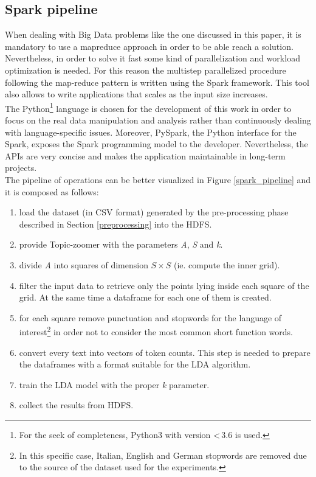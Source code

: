 \documentclass{sig-alternate-05-2015}
\begin{document}
\subsection{Spark pipeline}
When dealing with Big Data problems like the one discussed in this paper, it is mandatory to use a map\-reduce approach in order to be able reach a solution. Nevertheless, in order to solve it fast some kind of parallelization and workload optimization is needed. For this reason the multi\-step parallelized procedure following the map-reduce pattern is written using the Spark framework. This tool also allows to write applications that scales as the input size increases.\\
The Python\footnote{For the seek of completeness, Python3 with version \textless\,3.6 is used.} language is chosen for the development of this work in order to focus on the real data manipulation and analysis rather than continuously dealing with language-specific issues. Moreover, PySpark, the Python interface for the Spark, exposes the Spark programming model to the developer. Nevertheless, the APIs are very concise and makes the application maintainable in long-term projects.\\
The pipeline of operations can be better visualized in Figure \ref{spark_pipeline} and it is composed as follows:
\begin{enumerate}
    \item load the dataset (in CSV format) generated by the pre-processing phase described in Section \ref{preprocessing} into the HDFS.
    \item provide Topic-zoomer with the parameters \emph{A}, \emph{S} and \emph{k}.
    \item divide \emph{A} into squares of dimension $S \times S$ (ie. compute the inner grid).
    \item filter the input data to retrieve only the points lying inside each square of the grid. At the same time a dataframe for each one of them is created.
    \item for each square remove punctuation and stopwords\cite{mmd} for the language of interest\footnote{In this specific case, Italian, English and German stopwords are removed due to the source of the dataset used for the experiments.} in order not to consider the most common short function words.
    \item convert every text into vectors of token counts. This step is needed to prepare the dataframes with a format suitable for the LDA algorithm.
    \item train the LDA model with the proper \emph{k} parameter.
    \item collect the results from HDFS.
\end{enumerate}
\end{document}
